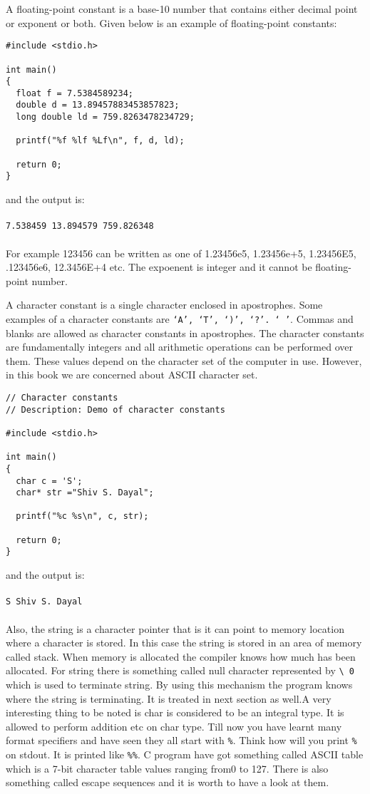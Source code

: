 A floating-point constant is a base-10 number that contains either decimal
point or exponent or both. Given below is an example of floating-point
constants:

\begin{verbatim}
#include <stdio.h>

int main()
{
  float f = 7.5384589234;
  double d = 13.89457883453857823;
  long double ld = 759.8263478234729;

  printf("%f %lf %Lf\n", f, d, ld);

  return 0;
}
\end{verbatim}

and the output is:
\\\\\texttt{7.538459 13.894579 759.826348\\\\}
For example 123456 can be written as one of 1.23456e5, 1.23456e+5, 1.23456E5,
.123456e6, 12.3456E+4 etc. The expoenent is integer and it cannot be
floating-point number.

A character constant is a single character enclosed in apostrophes. Some
examples of a character constants are \texttt{`A', `T', `)', `?'. ` '}. Commas
and blanks are allowed as character constants in apostrophes. The character
constants are fundamentally integers and all arithmetic operations can be
performed over them. These values depend on the character set of the computer
in use. However, in this book we are concerned about ASCII character set.

\begin{verbatim}
// Character constants
// Description: Demo of character constants

#include <stdio.h>

int main()
{
  char c = 'S';
  char* str ="Shiv S. Dayal";

  printf("%c %s\n", c, str);

  return 0;
}
\end{verbatim}

and the output is:
\\\\\texttt{S Shiv S. Dayal\\\\}
Also, the string is a character pointer that is it can point to memory location
where a character is stored. In this case the string is stored in an area of
memory called stack. When memory is allocated the compiler knows how much has
been allocated. For string there is something called null character represented
by \texttt{\textbackslash{} 0} which is used to terminate string. By using this mechanism
the program knows where the string is terminating. It is treated in next
section as well.A very interesting thing to be noted is char is considered to
be an integral type. It is allowed to perform addition etc on char type. Till
now you have learnt many format specifiers and have seen they all start with
\texttt{\%}. Think how will you print \texttt{\%} on stdout. It is printed like
\texttt{\%\%}.  C program have got something called ASCII table which is a
7-bit character table values ranging from0 to 127. There is also something
called escape sequences and it is worth to have a look at them.

